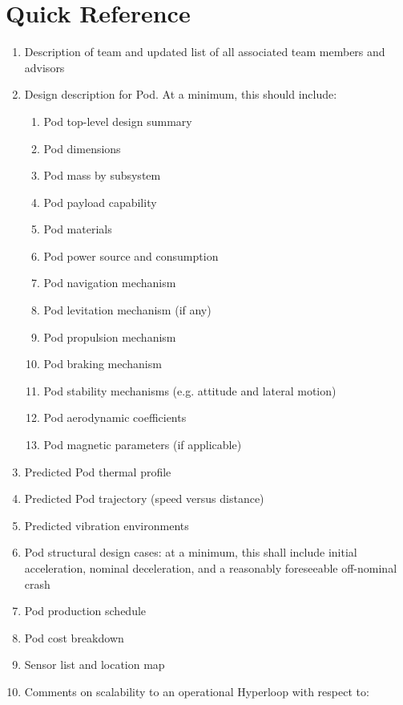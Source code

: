 \documentclass{report}
\begin{document}
    \chapter*{Quick Reference}
    \begin{enumerate}
        \item Description of team and updated list of all associated team members and advisors
        \item Design description for Pod. At a minimum, this should include:
        \begin{enumerate}
            \item Pod top-level design summary
            \item Pod dimensions
            \item Pod mass by subsystem
            \item Pod payload capability
            \item Pod materials
            \item Pod power source and consumption
            \item Pod navigation mechanism
            \item Pod levitation mechanism (if any)
            \item Pod propulsion mechanism
            \item Pod braking mechanism
            \item Pod stability mechanisms (e.g. attitude and lateral motion)
            \item Pod aerodynamic coefficients
            \item Pod magnetic parameters (if applicable)
        \end{enumerate}
        \item Predicted Pod thermal profile
        \item Predicted Pod trajectory (speed versus distance)
        \item Predicted vibration environments
        \item Pod structural design cases: at a minimum, this shall include initial acceleration, nominal deceleration, and a reasonably foreseeable off-nominal crash
        \item Pod production schedule
        \item Pod cost breakdown
        \item Sensor list and location map
        \item Comments on scalability to an operational Hyperloop with respect to:
        \begin{enumerate}

\end{enumerate}
\end{enumerate}
\end{document}
